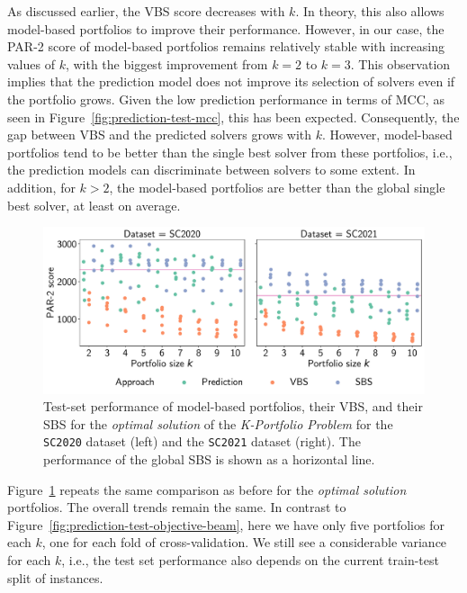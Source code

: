 \documentclass[a4paper,USenglish,pdfa]{lipics-v2021} %
\begin{document}
As discussed earlier, the VBS score decreases with $k$.
In theory, this also allows model-based portfolios to improve their performance.
However, in our case, the \mbox{PAR-2} score of model-based portfolios remains relatively stable with increasing values of $k$, with the biggest improvement from $k=2$ to $k=3$.
This observation implies that the prediction model does not improve its selection of solvers even if the portfolio grows.
Given the low prediction performance in terms of MCC, as seen in Figure~\ref{fig:prediction-test-mcc}, this has been expected.
Consequently, the gap between VBS and the predicted solvers grows with $k$.
However, model-based portfolios tend to be better than the single best solver from these portfolios, i.e., the prediction models can discriminate between solvers to some extent.
In addition, for $k > 2$, the model-based portfolios are better than the global single best solver, at least on average.

\begin{figure}[htb]
	\centering
	\includegraphics[width=\columnwidth]{plots/prediction-test-objective-optimal.pdf}
	\caption{
		Test-set performance of model-based portfolios, their VBS, and their SBS for the \emph{optimal solution} of the \emph{K-Portfolio Problem} for the \texttt{SC2020} dataset (left) and the \texttt{SC2021} dataset (right).
		The performance of the global SBS is shown as a horizontal line.
	}
	\label{fig:prediction-test-objective-optimal}
\end{figure}

Figure~\ref{fig:prediction-test-objective-optimal} repeats the same comparison as before for the \emph{optimal solution} portfolios.
The overall trends remain the same.
In contrast to Figure~\ref{fig:prediction-test-objective-beam}, here we have only five portfolios for each $k$, one for each fold of cross-validation.
We still see a considerable variance for each $k$, i.e., the test set performance also depends on the current train-test split of instances.
\end{document}
